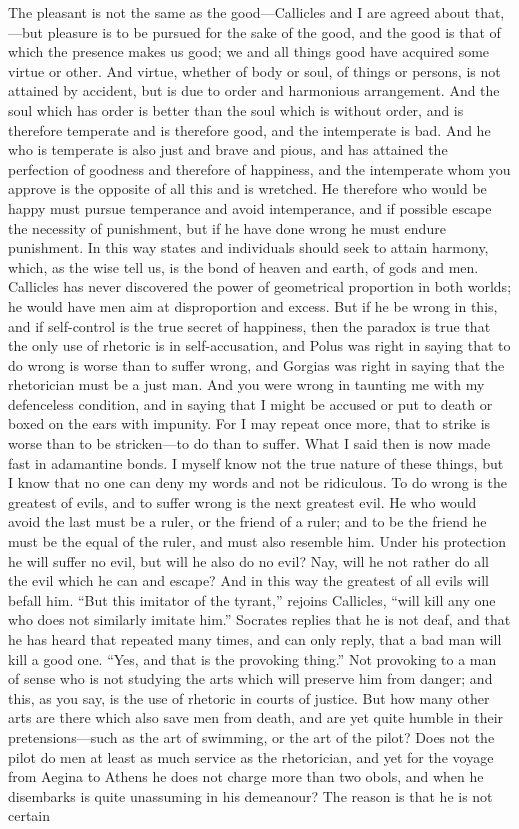 \documentclass[11pt,letter]{article}
\begin{document}
\par  The pleasant is not the same as the good—Callicles and I are agreed about that,—but pleasure is to be pursued for the sake of the good, and the good is that of which the presence makes us good; we and all things good have acquired some virtue or other. And virtue, whether of body or soul, of things or persons, is not attained by accident, but is due to order and harmonious arrangement. And the soul which has order is better than the soul which is without order, and is therefore temperate and is therefore good, and the intemperate is bad. And he who is temperate is also just and brave and pious, and has attained the perfection of goodness and therefore of happiness, and the intemperate whom you approve is the opposite of all this and is wretched. He therefore who would be happy must pursue temperance and avoid intemperance, and if possible escape the necessity of punishment, but if he have done wrong he must endure punishment. In this way states and individuals should seek to attain harmony, which, as the wise tell us, is the bond of heaven and earth, of gods and men. Callicles has never discovered the power of geometrical proportion in both worlds; he would have men aim at disproportion and excess. But if he be wrong in this, and if self-control is the true secret of happiness, then the paradox is true that the only use of rhetoric is in self-accusation, and Polus was right in saying that to do wrong is worse than to suffer wrong, and Gorgias was right in saying that the rhetorician must be a just man. And you were wrong in taunting me with my defenceless condition, and in saying that I might be accused or put to death or boxed on the ears with impunity. For I may repeat once more, that to strike is worse than to be stricken—to do than to suffer. What I said then is now made fast in adamantine bonds. I myself know not the true nature of these things, but I know that no one can deny my words and not be ridiculous. To do wrong is the greatest of evils, and to suffer wrong is the next greatest evil. He who would avoid the last must be a ruler, or the friend of a ruler; and to be the friend he must be the equal of the ruler, and must also resemble him. Under his protection he will suffer no evil, but will he also do no evil? Nay, will he not rather do all the evil which he can and escape? And in this way the greatest of all evils will befall him. “But this imitator of the tyrant,” rejoins Callicles, “will kill any one who does not similarly imitate him.” Socrates replies that he is not deaf, and that he has heard that repeated many times, and can only reply, that a bad man will kill a good one. “Yes, and that is the provoking thing.” Not provoking to a man of sense who is not studying the arts which will preserve him from danger; and this, as you say, is the use of rhetoric in courts of justice. But how many other arts are there which also save men from death, and are yet quite humble in their pretensions—such as the art of swimming, or the art of the pilot? Does not the pilot do men at least as much service as the rhetorician, and yet for the voyage from Aegina to Athens he does not charge more than two obols, and when he disembarks is quite unassuming in his demeanour? The reason is that he is not certain 
\end{document}
